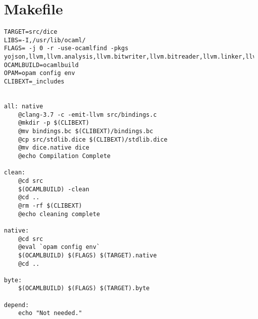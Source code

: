 \section{Makefile}
\begin{verbatim}
TARGET=src/dice
LIBS=-I,/usr/lib/ocaml/
FLAGS= -j 0 -r -use-ocamlfind -pkgs yojson,llvm,llvm.analysis,llvm.bitwriter,llvm.bitreader,llvm.linker,llvm.target,batteries
OCAMLBUILD=ocamlbuild
OPAM=opam config env
CLIBEXT=_includes


all: native
	@clang-3.7 -c -emit-llvm src/bindings.c
	@mkdir -p $(CLIBEXT)
	@mv bindings.bc $(CLIBEXT)/bindings.bc
	@cp src/stdlib.dice $(CLIBEXT)/stdlib.dice
	@mv dice.native dice
	@echo Compilation Complete

clean:
	@cd src
	$(OCAMLBUILD) -clean
	@cd ..
	@rm -rf $(CLIBEXT)
	@echo cleaning complete

native:
	@cd src
	@eval `opam config env`
	$(OCAMLBUILD) $(FLAGS) $(TARGET).native
	@cd ..

byte:
	$(OCAMLBUILD) $(FLAGS) $(TARGET).byte

depend:
	echo "Not needed." 
\end{verbatim}